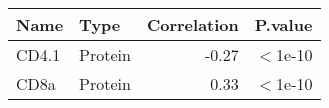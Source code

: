 \begin{tabular}{llrl}
  \hline
Name & Type & Correlation & P.value \\ 
  \hline
CD4.1 & Protein & -0.27 & $<$1e-10 \\ 
  CD8a & Protein & 0.33 & $<$1e-10 \\ 
   \hline
\end{tabular}
